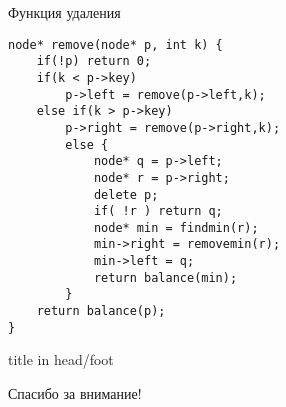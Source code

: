 \documentclass{beamer}
\begin{document}
\begin{frame}[fragile]{Функция удаления}
    \begin{small}
        \begin{verbatim}
node* remove(node* p, int k) {
    if(!p) return 0;
    if(k < p->key)
        p->left = remove(p->left,k);
    else if(k > p->key)
        p->right = remove(p->right,k);	
        else {
            node* q = p->left;
            node* r = p->right;
            delete p;
            if( !r ) return q;
            node* min = findmin(r);
            min->right = removemin(r);
            min->left = q;
            return balance(min);
        }
    return balance(p);
}
    \end{verbatim}
    \end{small}
\end{frame}

\begin{frame}
    \begin{beamercolorbox}[ht=7ex, dp=4ex, center, shadow=false, rounded=true]{title in head/foot}
        \centerline{\LARGE{Спасибо за внимание!}}
    \end{beamercolorbox}
\end{frame}
\end{document}
